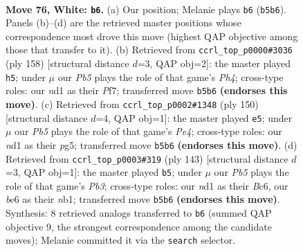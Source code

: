 \documentclass[11pt]{article}
\begin{document}
\clearpage

\begin{figure}[p]\centering
\begin{subfigure}{0.46\textwidth}\centering
\resizebox{\linewidth}{!}{%
\newchessgame
\chessboard[
  setfen={8/7k/P3b3/1P6/8/6K1/8/3n4 w - - 5 76},
  showmover=false,
  pgfstyle=straightmove, color=movearrow, markmove={b5-b6}
]}
\caption{}
\end{subfigure}\hfill
\begin{subfigure}{0.46\textwidth}\centering
\resizebox{\linewidth}{!}{%
\newchessgame
\chessboard[
  setfen={8/5P2/8/2b3P1/4k2P/8/4K3/8 w - - 1 80},
  showmover=false,
  pgfstyle=straightmove, color=movearrow, markmove={h4-h5}
]}
\caption{}
\end{subfigure}
\\[4pt]
\begin{subfigure}{0.46\textwidth}\centering
\resizebox{\linewidth}{!}{%
\newchessgame
\chessboard[
  setfen={8/5b2/3K4/5Pp1/1k2P3/8/8/8 w - - 0 76},
  showmover=false,
  pgfstyle=straightmove, color=movearrow, markmove={e4-e5}
]}
\caption{}
\end{subfigure}\hfill
\begin{subfigure}{0.46\textwidth}\centering
\resizebox{\linewidth}{!}{%
\newchessgame
\chessboard[
  setfen={8/5k2/1pb5/p3K3/8/8/8/1N6 b - - 5 72},
  showmover=false,
  pgfstyle=straightmove, color=movearrow, markmove={b6-b5}
]}
\caption{}
\end{subfigure}
\caption{\textbf{Move 76, White: \texttt{b6}.} (a) Our position; Melanie plays \texttt{b6} (\texttt{b5b6}). Panels (b)--(d) are the retrieved master positions whose correspondence most drove this move (highest QAP objective among those that transfer to it). (b) Retrieved from \texttt{ccrl\_top\_p0000\#3036} (ply 158) [structural distance $d$=3, QAP obj=2]: the master played \texttt{h5}; under $\mu$ our \emph{Pb5} plays the role of that game's \emph{Ph4}; cross-type roles: our \emph{n}d1 as their \emph{P}f7; transferred move \texttt{b5b6} \textbf{(endorses this move)}. (c) Retrieved from \texttt{ccrl\_top\_p0002\#1348} (ply 150) [structural distance $d$=4, QAP obj=1]: the master played \texttt{e5}; under $\mu$ our \emph{Pb5} plays the role of that game's \emph{Pe4}; cross-type roles: our \emph{n}d1 as their \emph{p}g5; transferred move \texttt{b5b6} \textbf{(endorses this move)}. (d) Retrieved from \texttt{ccrl\_top\_p0003\#319} (ply 143) [structural distance $d$=3, QAP obj=1]: the master played \texttt{b5}; under $\mu$ our \emph{Pb5} plays the role of that game's \emph{Pb3}; cross-type roles: our \emph{n}d1 as their \emph{B}c6, our \emph{b}e6 as their \emph{n}b1; transferred move \texttt{b5b6} \textbf{(endorses this move)}. Synthesis: 8 retrieved analogs transferred to \texttt{b6} (summed QAP objective 9, the strongest correspondence among the candidate moves); Melanie committed it via the \texttt{search} selector.}
\label{fig:thought-m150}
\end{figure}
\end{document}
